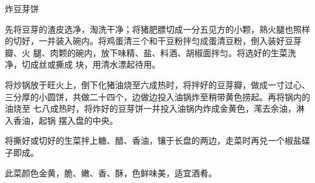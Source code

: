 %
%
%
%
%
%
%
\begin{recipe}{炸豆芽饼}

\ingredients


\preparation

\step 先将豆芽的渣皮选净，淘洗干净；将猪肥膘切成一分五见方的小颗，熟火腿也照样
的切好，一并装入碗内。将鸡蛋清三个和干豆粉拌匀成蛋清豆粉，倒入装好豆芽瓣、火
腿、肉颗的碗内，放下味精、盐、料酒、胡椒面拌匀。将选好的生菜洗净，切成丝或撕成
块，用清水漂起待用。

\step 将炒锅放于旺火上，倒下化猪油烧至六成热时，将拌好的豆芽瓣，做成一寸过心、
三分厚的小圆饼，共做二十四个，边做边投入油锅炸至稍带黄色捞起。再将锅内的油烧至
七八成热时，将炸好的豆芽饼一并投入油锅内炸成金黄色，滗去余油，淋入香油，起锅
摆入盘的中央。

\step 将撕好或切好的生菜拌上糖、醋、香油，镶于长盘的两边，走菜时再兑一个椒盐碟
子即成。

\features

此菜颜色金黄，脆、嫩、香、酥，色鲜味美，适宜酒肴。

\end{recipe}

